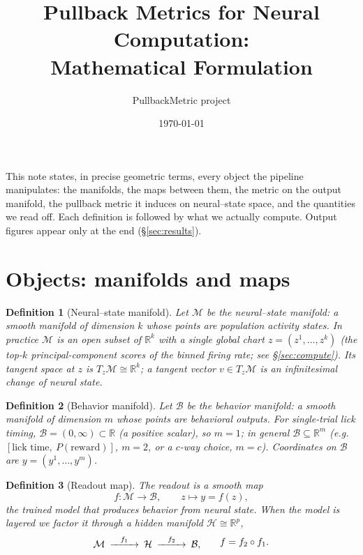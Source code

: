 \documentclass[11pt]{article}
\title{\bf Pullback Metrics for Neural Computation:\\ Mathematical Formulation}
\author{PullbackMetric project}
\date{\today}
\newtheorem{definition}{Definition}
\newcommand{\M}{\mathcal{M}}
\newcommand{\B}{\mathcal{B}}
\newcommand{\Hh}{\mathcal{H}}
\newcommand{\T}{T}
\newcommand{\R}{\mathbb{R}}
\begin{document}
\maketitle

\noindent
This note states, in precise geometric terms, every object the pipeline manipulates: the
manifolds, the maps between them, the metric on the output manifold, the pullback metric it
induces on neural--state space, and the quantities we read off. Each definition is followed
by what we actually compute. Output figures appear only at the end (\S\ref{sec:results}).

\section{Objects: manifolds and maps}\label{sec:objects}

\begin{definition}[Neural--state manifold]
Let $\M$ be the \emph{neural--state manifold}: a smooth manifold of dimension $k$ whose
points are population activity states. In practice $\M$ is an open subset of $\R^{k}$ with a
single global chart $z=(z^{1},\dots,z^{k})$ (the top-$k$ principal-component scores of the
binned firing rate; see \S\ref{sec:compute}). Its tangent space at $z$ is
$\T_{z}\M\cong\R^{k}$; a tangent vector $v\in \T_z\M$ is an infinitesimal change of neural
state.
\end{definition}

\begin{definition}[Behavior manifold]
Let $\B$ be the \emph{behavior manifold}: a smooth manifold of dimension $m$ whose points are
behavioral outputs. For single-trial lick timing, $\B=(0,\infty)\subset\R$ (a positive
scalar), so $m=1$; in general $\B\subseteq\R^{m}$ (e.g.\ $[\text{lick time},\ P(\text{reward})]$,
$m=2$, or a $c$-way choice, $m=c$). Coordinates on $\B$ are $y=(y^{1},\dots,y^{m})$.
\end{definition}

\begin{definition}[Readout map]
The \emph{readout} is a smooth map
\[
  f:\M\longrightarrow\B ,\qquad z\mapsto y=f(z),
\]
the trained model that produces behavior from neural state. When the model is layered we
factor it through a hidden manifold $\Hh\cong\R^{p}$,
\[
  \begin{CD}
    \M @>{f_{1}}>> \Hh @>{f_{2}}>> \B ,
  \end{CD}
  \qquad f=f_{2}\circ f_{1}.
\]
\end{definition}
\end{document}
